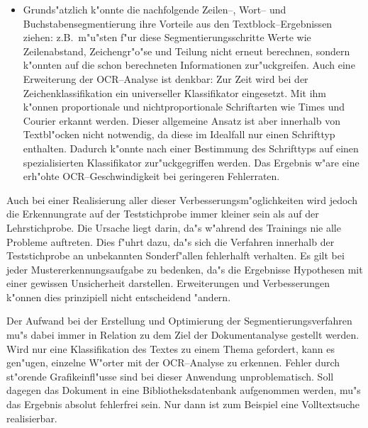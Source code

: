 \begin{itemize}
\item
Grunds"atzlich k"onnte die nachfolgende Zeilen--, Wort-- und Buchstabensegmentierung
ihre Vorteile aus den Textblock--Ergebnissen ziehen: z.B.\ m"u"sten f"ur diese Segmentierungsschritte
Werte wie Zeilenabstand, Zeichengr"o"se und Teilung nicht erneut berechnen, sondern k"onnten
auf die schon berechneten Informationen zur"uckgreifen.
Auch eine Erweiterung der OCR--Analyse ist denkbar:
Zur Zeit wird bei der Zeichenklassifikation ein universeller Klassifikator eingesetzt. Mit ihm
k"onnen proportionale und nichtproportionale Schriftarten wie Times und Courier erkannt werden.
Dieser allgemeine Ansatz ist aber innerhalb von Textbl"ocken nicht notwendig, da diese im
Idealfall nur einen Schrifttyp enthalten. Dadurch k"onnte nach einer Bestimmung des Schrifttyps
auf einen spezialisierten Klassifikator zur"uckgegriffen werden. Das Ergebnis w"are eine erh"ohte
OCR--Ge\-schwindig\-keit bei geringeren Fehlerraten.

\end{itemize}

Auch bei einer Realisierung aller dieser Verbesserungsm"oglichkeiten wird jedoch die 
Erkennungrate auf der Teststichprobe immer kleiner sein als auf der Lehrstichprobe. 
Die Ursache liegt darin, da"s w"ahrend des Trainings nie alle Probleme auftreten. 
Dies f"uhrt dazu, da"s sich die Verfahren 
innerhalb der Teststichprobe an unbekannten Sonderf"allen fehlerhalft verhalten.
Es gilt bei jeder Mustererkennungsaufgabe zu bedenken, da"s die Ergebnisse Hypothesen 
mit einer gewissen Unsicherheit darstellen. 
Erweiterungen und Verbesserungen k"onnen dies prinzipiell nicht entscheidend "andern. 

Der Aufwand bei der Erstellung und Optimierung der Segmentierungsverfahren mu"s dabei immer in
Relation zu dem Ziel der Dokumentanalyse gestellt werden. Wird nur eine 
Klassifikation des Textes zu einem Thema gefordert, kann es gen"ugen, einzelne W"orter 
mit der OCR--Analyse zu erkennen. 
Fehler durch st"orende Grafikeinfl"usse sind bei dieser Anwendung unproblematisch.
Soll dagegen das Dokument in eine Bibliotheksdatenbank aufgenommen werden,
mu"s das Ergebnis absolut fehlerfrei sein. Nur dann ist zum Beispiel eine Volltextsuche
realisierbar.
\newpage
